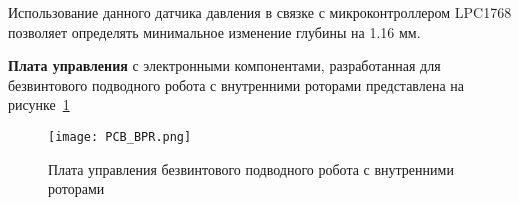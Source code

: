 Использование данного датчика давления в связке с микроконтроллером LPC1768 позволяет определять минимальное изменение глубины на 1.16 мм. 



\textbf{Плата управления} с электронными компонентами, разработанная для безвинтового подводного робота с внутренними роторами представлена на рисунке~\ref{PCB_BPR}

\begin{figure}[h!]
	\begin{center}
		\texttt{[image: PCB\_BPR.png]}
		\caption{Плата управления безвинтового подводного робота с внутренними роторами} \label{PCB_BPR}
	\end{center}
\end{figure}














\clearpage